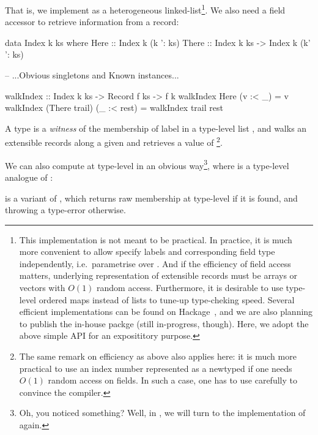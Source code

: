 \documentclass[demotion-paper.tex]{subfiles}
\begin{document}
That is, we implement  as a heterogeneous linked-list\footnote{%
This implementation is not meant to be practical.
In practice, it is much more convenient to allow specify labels and corresponding field type independently, i.e.\ parametrise  over .
And if the efficiency of field access matters, underlying representation of extensible records must be arrays or vectors with $O(1)$ random access.
Furthermore, it is desirable to use type-level ordered maps instead of lists to tune-up type-cheking speed.
Several efficient implementations can be found on Hackage~\cite{Kinoshita:2020aa,Sterling:2020aa,Thiemann:2020aa}, and we are also planning to publish the in-house packge (still in-progress, though).
Here, we adopt the above simple API for an exposititory purpose.}.
We also need a field accessor to retrieve information from a record:
\begin{code}
data Index k ks where
  Here  :: Index k (k ': ks)
  There :: Index k ks -> Index k (k' ': ks)

-- ...Obvious singletons and Known instances...

walkIndex :: Index k ks -> Record f ks -> f k
walkIndex Here (v :< _) = v
walkIndex (There trail) (_ :< rest) = 
  walkIndex trail rest  
\end{code}
A type  is a \emph{witness} of the membership of label  in a type-level list , and  walks an extensible records along a given  and retrieves a value of \footnote{The same remark on efficiency as above also applies here: it is much more practical to use an index number represented as a newtyped  if one needs $O(1)$ random access on fields.
In such a case, one has to use  carefully to convince the compiler.}.

We can also compute  at type-level in an obvious way\footnote{Oh, you noticed something? Well, in , we will turn to the implementation of  again.}, where \hask{(<$>)} is a type-level analogue of :
 is a variant of , which returns raw membership at type-level if it is found, and throwing a type-error otherwise.
\end{document}
